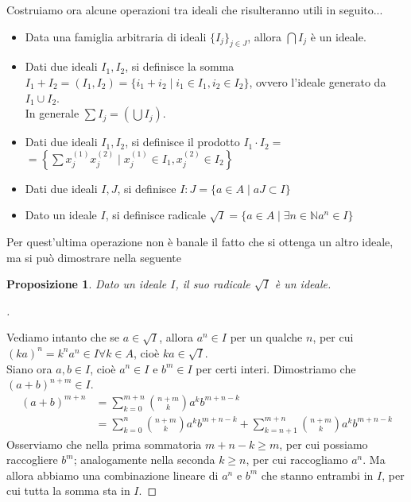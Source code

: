 \documentclass[a4paper,10pt]{article}
\theoremstyle{plain}
\newtheorem{prop}[thm]{Proposizione}
\theoremstyle{definition}
\newenvironment{myproof}[1][\proofname]{%
  \begin{proof}[#1]$ $\par\nobreak\ignorespaces
}{%
  \qedhere
  \end{proof}
}
\newcommand{\N}{\mathbb{N}}
\begin{document}
Costruiamo ora alcune operazioni tra ideali che risulteranno utili in seguito...
\begin{itemize}
    \item Data una famiglia arbitraria di ideali $\{I_j\}_{j\in J}$, allora $\bigcap I_j$ è un ideale.
    \item Dati due ideali $I_1,I_2$, si definisce la somma $I_1+I_2=(I_1,I_2)=\{i_1+i_2\mid i_1\in I_1, i_2\in I_2\}$, ovvero l'ideale generato da $I_1\cup I_2$.\\
    In generale $\sum I_j=(\bigcup I_j)$.
    \item Dati due ideali $I_1,I_2$, si definisce il prodotto $I_1\cdot I_2=$\\$\displaystyle=\left\{ \sum x_j^{(1)}x_j^{(2)} \mid x_j^{(1)}\in I_1, x_j^{(2)}\in I_2 \right\}$
    \item Dati due ideali $I,J$, si definisce $I:J=\{ a\in A \mid aJ\subset I \}$
    \item Dato un ideale $I$, si definisce radicale $\sqrt I=\{ a\in A \mid \exists n\in\N a^n\in I \}$
\end{itemize}

Per quest'ultima operazione non è banale il fatto che si ottenga un altro ideale, ma si può dimostrare nella seguente

\begin{prop}
    Dato un ideale $I$, il suo radicale $\sqrt I$ è un ideale.
\end{prop}
\begin{myproof}
    Vediamo intanto che se $a\in\sqrt I$, allora $a^n\in I$ per un qualche $n$, per cui $(ka)^n=k^na^n\in I\forall k\in A$, cioè $ka\in\sqrt I$.\\
    Siano ora $a,b\in I$, cioè $a^n\in I$ e $b^m\in I$ per certi interi. Dimostriamo che $(a+b)^{n+m}\in I$.\\
    \begin{align*}
        \displaystyle (a+b)^{m+n} &= \sum_{k=0}^{m+n}\binom{n+m}k a^kb^{m+n-k} \\ &= \sum_{k=0}^n\binom{n+m}k a^kb^{m+n-k} + \sum_{k=n+1}^{m+n}\binom{n+m}k a^kb^{m+n-k}
    \end{align*}
    Osserviamo che nella prima sommatoria $m+n-k\ge m$, per cui possiamo raccogliere $b^m$; analogamente nella seconda $k\ge n$, per cui raccogliamo $a^n$. Ma allora abbiamo una combinazione lineare di $a^n$ e $b^m$ che stanno entrambi in $I$, per cui tutta la somma sta in $I$.
\end{myproof}
\end{document}
